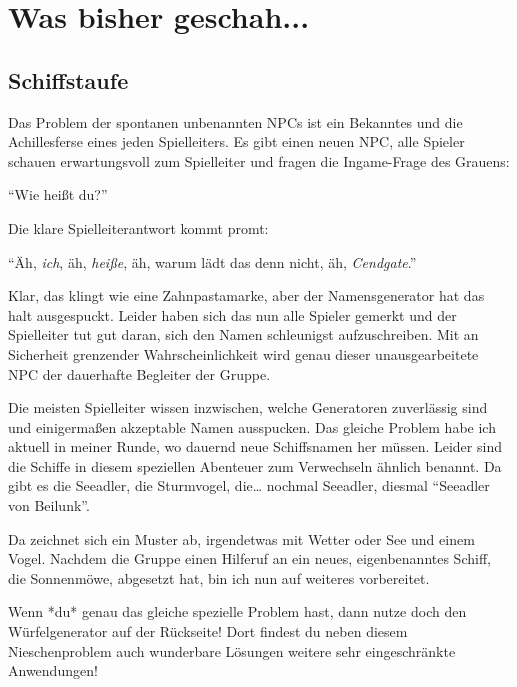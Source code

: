 \documentclass[final]{multiversum}
\begin{document}
\makemultititle
%

\section{Was bisher geschah...}

\subsection{Schiffstaufe}
Das Problem der spontanen unbenannten NPCs ist ein Bekanntes und die Achillesferse eines jeden Spielleiters.
Es gibt einen neuen NPC, alle Spieler schauen erwartungsvoll zum Spielleiter und fragen die Ingame-Frage des Grauens:

\enquote{Wie heißt du?}

Die klare Spielleiterantwort kommt promt:

\enquote{Äh, \textit{ich}, äh, \textit{heiße}, äh, warum lädt das denn nicht, äh, \textit{Cendgate}.}

Klar, das klingt wie eine Zahnpastamarke, aber der Namensgenerator hat das halt ausgespuckt.
Leider haben sich das nun alle Spieler gemerkt und der Spielleiter tut gut daran, sich den Namen schleunigst aufzuschreiben.
Mit an Sicherheit grenzender Wahrscheinlichkeit wird genau dieser unausgearbeitete NPC der dauerhafte Begleiter der Gruppe.

Die meisten Spielleiter wissen inzwischen, welche Generatoren zuverlässig sind und einigermaßen akzeptable Namen ausspucken.
Das gleiche Problem habe ich aktuell in meiner Runde, wo dauernd neue Schiffsnamen her müssen.
Leider sind die Schiffe in diesem speziellen Abenteuer zum Verwechseln ähnlich benannt.
Da gibt es die Seeadler, die Sturmvogel, die\dots{ }nochmal Seeadler, diesmal \enquote{Seeadler von Beilunk}.

Da zeichnet sich ein Muster ab, irgendetwas mit Wetter oder See und einem Vogel.
Nachdem die Gruppe einen Hilferuf an ein neues, eigenbenanntes Schiff, die Sonnenmöwe, abgesetzt hat, bin ich nun auf weiteres vorbereitet.

Wenn *du* genau das gleiche spezielle Problem hast, dann nutze doch den Würfelgenerator auf der Rückseite!
Dort findest du neben diesem Nieschenproblem auch wunderbare Lösungen weitere sehr eingeschränkte Anwendungen!
\pagebreak
\end{document}
